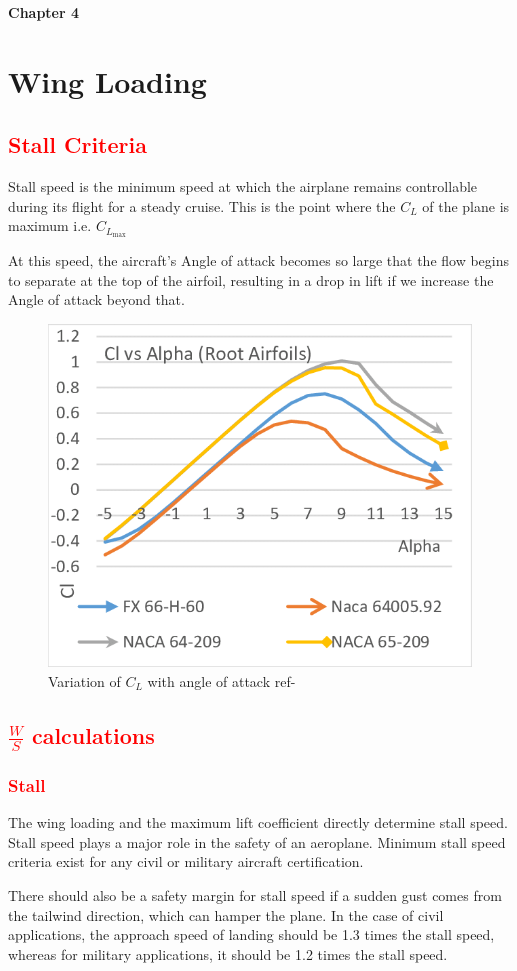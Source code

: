 \documentclass[12 pt]{article}
\begin{document}
\textbf{\Huge{Chapter 4}}

\section{Wing Loading}

\subsection{\textcolor{red}{Stall Criteria}}
Stall speed is the minimum speed at which the airplane remains controllable during its flight for a steady cruise.\cite{stall1} This is the point where the $C_L$ of the plane is maximum i.e. $C_{L_{\text{max}}}$

At this speed, the aircraft's Angle of attack becomes so large that the flow begins to separate at the top of the airfoil, resulting in a drop in lift if we increase the Angle of attack beyond that.

\begin{figure}[h]
    \centering
    \includegraphics[width=0.4\linewidth]{Extra pics/Cllvsalpha.png}
    \caption{Variation of $C_L$ with angle of attack ref- \cite{stallpic}}
    \label{Variation of $C_L$ with angle}
\end{figure}

\subsection{\textcolor{red}{ $\frac{W}{S}$ calculations } }

\subsubsection{\textcolor{red}{Stall}}

The wing loading and the maximum lift coefficient directly determine stall speed. Stall speed plays a major role in the safety of an aeroplane. Minimum stall speed criteria exist for any civil or military aircraft certification.

There should also be a safety margin for stall speed if a sudden gust comes from the tailwind direction, which can hamper the plane. In the case of civil applications, the approach speed of landing should be 1.3 times the stall speed, whereas for military applications, it should be 1.2 times the stall speed.
\end{document}
